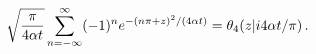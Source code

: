 \[\sqrt{\frac{\pi}{4\alpha t}}\sum\limits_{n=-\infty}^{\infty}(-1)^{n}e^{-(n\pi+%
z)^{2}/(4\alpha t)}=\mathop{\theta_{4}\/}\nolimits\!\left(z\middle|i4\alpha t/%
\pi\right).\]